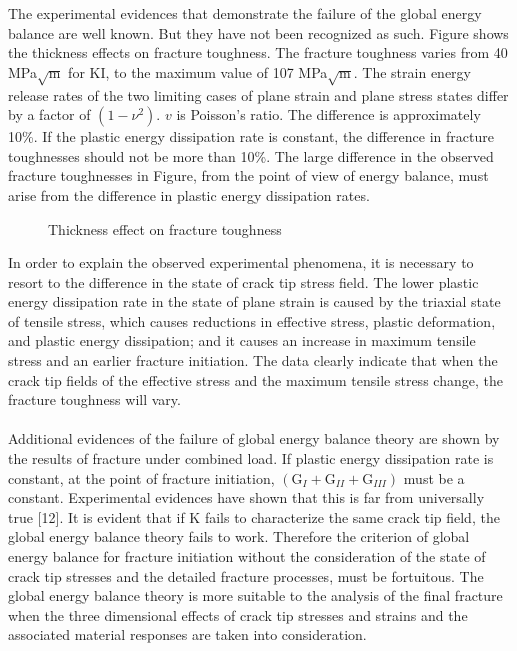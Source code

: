 \documentclass[11pt]{article}
\begin{document}
The experimental evidences that demonstrate the failure of the global energy balance are well known.
But they have not been recognized as such. Figure shows the thickness effects on fracture toughness.
The fracture toughness varies from 40 MPa$\sqrt{\text{m}}$ for KI, to the maximum value of 107 MPa$\sqrt{\text{m}}$. The
strain energy release rates of the two limiting cases of plane strain and plane stress states differ by a
factor of $(1 - \nu ^ 2)$. $v$ is Poisson’s ratio. The difference is approximately 10\%. If the plastic energy
dissipation rate is constant, the difference in fracture toughnesses should not be more than 10\%. The
large difference in the observed fracture toughnesses in Figure, from the point of view of energy balance,
must arise from the difference in plastic energy dissipation rates.

\begin{figure}[H]
    \centering
    \captionsetup{labelformat=empty}
    \caption{Thickness effect on fracture toughness}
\end{figure}
In order to explain the observed experimental phenomena, it is necessary to resort to the difference
in the state of crack tip stress field. The lower plastic energy dissipation rate in the state of plane strain is
caused by the triaxial state of tensile stress, which causes reductions in effective stress, plastic
deformation, and plastic energy dissipation; and it causes an increase in maximum tensile stress and an
earlier fracture initiation. The data clearly indicate that when the crack tip fields of the effective stress
and the maximum tensile stress change, the fracture toughness will vary.\\\\
Additional evidences of the failure of global energy balance theory are shown by the results of
fracture under combined load. If plastic energy dissipation rate is constant, at the point of fracture
initiation, $(\text{G}_{I} + \text{G}_{II} + \text{G}_{III})$ must be a constant. Experimental evidences have shown that this is far from
universally true [12]. It is evident that if K fails to characterize the same crack tip field, the global energy
balance theory fails to work. Therefore the criterion of global energy balance for fracture initiation
without the consideration of the state of crack tip stresses and the detailed fracture processes, must be
fortuitous. The global energy balance theory is more suitable to the analysis of the final fracture when
the three dimensional effects of crack tip stresses and strains and the associated material responses are
taken into consideration.
\end{document}
